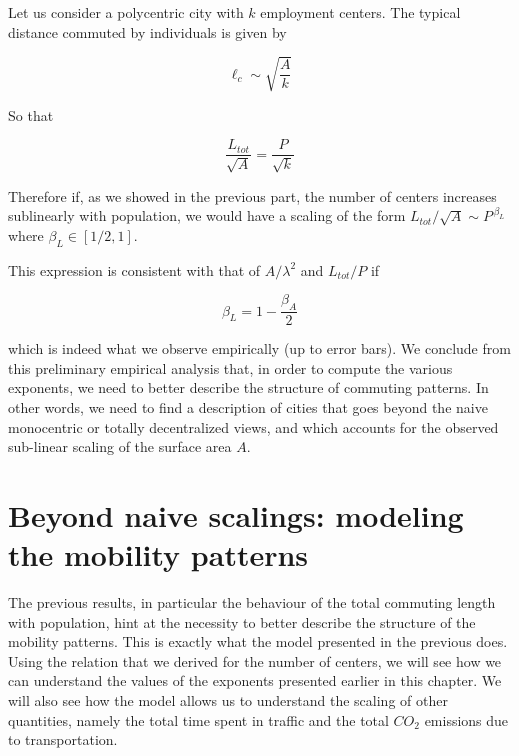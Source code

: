 Let us consider a polycentric city with $k$ employment centers. The typical
distance commuted by individuals is given by

\begin{equation}
    \ell_c \sim \sqrt{\frac{A}{k}}
\end{equation}

So that

\begin{equation}
    \frac{L_{tot}}{\sqrt{A}} = \frac{P}{\sqrt{k}}
\end{equation}

Therefore if, as we showed in the previous part,  the number of centers
increases sublinearly with population, we would have a scaling of the form
$L_{tot}/\sqrt{A}\sim P^{\,\beta_L}$ where $\beta_L \in [1/2,1]$. 

This expression is consistent with that of $A/\lambda^2$
and $L_{tot}/P$ if

\begin{equation} 
    \beta_L = 1-\frac{\beta_A}{2} 
    \label{eq:consis} 
\end{equation}

which is indeed what we observe empirically (up to error bars). We conclude from
this preliminary empirical analysis that, in order to compute the various
exponents, we need to better describe the structure of commuting patterns. In
other words, we need to find a description of cities that goes beyond the naive
monocentric or totally decentralized views, and which accounts for the observed
sub-linear scaling of the surface area $A$.






\section{Beyond naive scalings: modeling the mobility patterns}

The previous results, in particular the behaviour of the total commuting length
with population, hint at the necessity to better describe the structure of the
mobility patterns. This is exactly what the model presented in the previous
does.  Using the relation that we derived for the number of centers, we will see
how we can understand the values of the exponents presented earlier in this
chapter. We will also see how the model allows us to understand the scaling of
other quantities, namely the total time spent in traffic and the total $CO_2$
emissions due to transportation.

